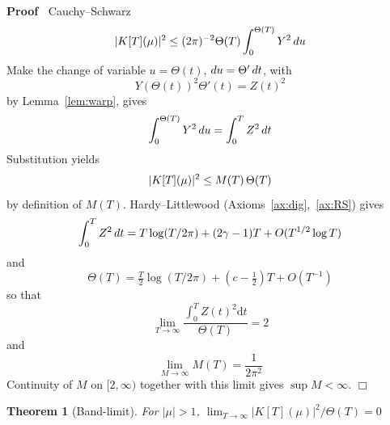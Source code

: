 \documentclass{article}
\newcommand{\mathd}{\mathrm{d}}
\newenvironment{proof}{\noindent\textbf{Proof\ }}{\hspace*{\fill}$\Box$\medskip}
\newtheorem{theorem}{Theorem}
\begin{document}
\begin{proof}
  Cauchy--Schwarz
  \begin{equation}
    |K [T] (\mu) |^2 \le (2 \pi)^{- 2} \Theta (T)  \int_0^{\Theta (T)} Y^2 
    \hspace{0.17em} du
  \end{equation}
  Make the change of variable $u = \Theta (t)$, $du = \Theta'  \hspace{0.17em}
  dt$, with
  \begin{equation}
    Y (\Theta (t))^2 \Theta' (t) = Z (t)^2
  \end{equation}
  by Lemma~\ref{lem:warp}, gives
  \begin{equation}
    \int_0^{\Theta (T)} Y^2  \hspace{0.17em} du = \int_0^T Z^2 
    \hspace{0.17em} dt
  \end{equation}
  Substitution yields
  \begin{equation}
    |K [T] (\mu) |^2 \le M (T)  \hspace{0.17em} \Theta (T)
  \end{equation}
  by definition of $M (T)$. Hardy--Littlewood
  (Axioms~\ref{ax:dig},~\ref{ax:RS}) gives
  \begin{equation}
    \int_0^T Z^2  \hspace{0.17em} dt = T \log (T / 2 \pi) + (2 \gamma - 1) T +
    O (T^{1 / 2} \log T)
  \end{equation}
  and
  \begin{equation}
    \Theta (T) = \tfrac{T}{2} \log (T / 2 \pi) + (c - \tfrac{1}{2}) T + O
    (T^{- 1})
  \end{equation}
  so that
  \begin{equation}
    \lim_{T \rightarrow \infty} \frac{\int_0^T Z (t)^2 \mathd t}{\Theta (T)} =
    2
  \end{equation}
  and
  \begin{equation}
    \lim_{M \rightarrow \infty} M (T) = \frac{1}{2 \pi^2}
  \end{equation}
  Continuity of $M$ on $[2, \infty)$ together with this limit gives $\sup M <
  \infty$.
\end{proof}

\begin{theorem}
  [Band-limit]\label{thm:band} For $| \mu | > 1$, $\lim_{T \to \infty} |K [T]
  (\mu) |^2 / \Theta (T) = 0$
\end{theorem}
\end{document}

